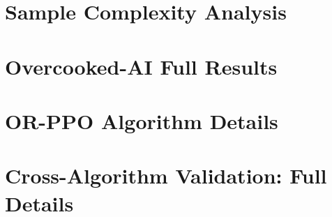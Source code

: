 \documentclass[twoside]{article}
\theoremstyle{remark}
\begin{document}



\section{Sample Complexity Analysis}
\label{app:sample_complexity}





\section{Overcooked-AI Full Results}
\label{app:overcooked}



\section{OR-PPO Algorithm Details}
\label{app:or_ppo}



\section{Cross-Algorithm Validation: Full Details}
\label{app:cross_algorithm}
\end{document}
